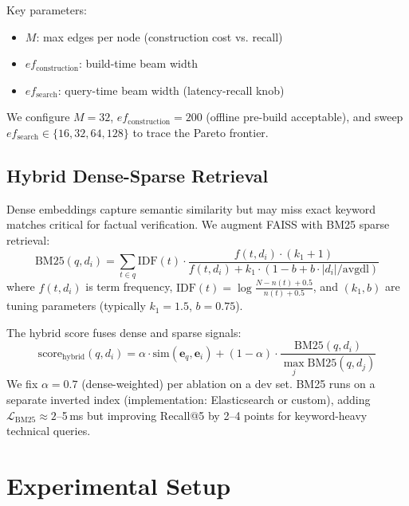 \documentclass[conference]{IEEEtran}
\begin{document}
Key parameters:
\begin{itemize}
\item $M$: max edges per node (construction cost vs. recall)
\item $ef_{\mathrm{construction}}$: build-time beam width
\item $ef_{\mathrm{search}}$: query-time beam width (latency-recall knob)
\end{itemize}

We configure $M{=}32$, $ef_{\mathrm{construction}}{=}200$ (offline pre-build acceptable), and sweep $ef_{\mathrm{search}} \in \{16, 32, 64, 128\}$ to trace the Pareto frontier.

\subsection{Hybrid Dense-Sparse Retrieval}

Dense embeddings capture semantic similarity but may miss exact keyword matches critical for factual verification. We augment FAISS with BM25 sparse retrieval:
\begin{equation}
\mathrm{BM25}(q, d_i) = \sum_{t \in q} \mathrm{IDF}(t) \cdot \frac{f(t, d_i) \cdot (k_1 + 1)}{f(t, d_i) + k_1 \cdot (1 - b + b \cdot |d_i|/\mathrm{avgdl})}
\label{eq:bm25}
\end{equation}
where $f(t, d_i)$ is term frequency, $\mathrm{IDF}(t) = \log\frac{N - n(t) + 0.5}{n(t) + 0.5}$, and $(k_1, b)$ are tuning parameters (typically $k_1{=}1.5$, $b{=}0.75$).

The hybrid score fuses dense and sparse signals:
\begin{equation}
\mathrm{score}_{\mathrm{hybrid}}(q, d_i) = \alpha \cdot \mathrm{sim}(\mathbf{e}_q, \mathbf{e}_i) + (1-\alpha) \cdot \frac{\mathrm{BM25}(q, d_i)}{\max_{j} \mathrm{BM25}(q, d_j)}
\label{eq:hybrid}
\end{equation}
We fix $\alpha{=}0.7$ (dense-weighted) per ablation on a dev set. BM25 runs on a separate inverted index (implementation: Elasticsearch or custom), adding $\mathcal{L}_{\mathrm{BM25}} \approx 2$--5\,ms but improving Recall@5 by 2--4 points for keyword-heavy technical queries.

\section{Experimental Setup}
\end{document}
